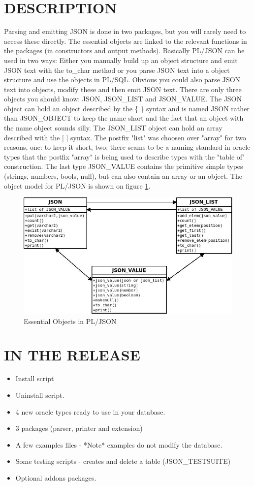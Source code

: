 \documentclass[11pt,a4paper]{article}
\begin{document}
\section{DESCRIPTION}
Parsing and emitting JSON is done in two packages, but you will rarely need to access these directly. The essential objects are linked to the relevant functions in the packages (in constructors and output methods). Basically PL/JSON can be used in two ways: Either you manually build up an object structure and emit JSON text with the to\_char method or you parse JSON text into a object structure and use the objects in PL/SQL. Obvious you could also parse JSON text into objects, modify these and then emit JSON text. There are only three objects you should know: JSON, JSON\_LIST and JSON\_VALUE. The JSON object can hold an object described by the \{ \} syntax and is named JSON rather than JSON\_OBJECT to keep the name short and the fact that an object with the name object sounds silly. The JSON\_LIST object can hold an array described with the [ ] syntax. The postfix "list" was choosen over "array" for two reasons, one: to keep it short, two: there seams to be a naming standard in oracle types that the postfix "array" is being used to describe types with the "table of" construction. The last type JSON\_VALUE contains the primitive simple types (strings, numbers, bools, null), but can also contain an array or an object. The object model for PL/JSON is shown on figure \ref{howjsonwork}.
\begin{figure}[!h]
  \begin{center}
    \includegraphics[width=0.8\linewidth]{visual.jpg}
  \end{center} 
  \caption{Essential Objects in PL/JSON}
  \label{howjsonwork}
\end{figure}
\newpage
\section{IN THE RELEASE}
\begin{itemize}
\item Install script
\item Uninstall script.
\item 4 new oracle types ready to use in your database.
\item 3 packages (parser, printer and extension)
\item A few examples files - *Note* examples do not modify the database.
\item Some testing scripts - creates and delete a table (JSON\_TESTSUITE)
\item Optional addons packages.
\end{itemize}
\end{document}
